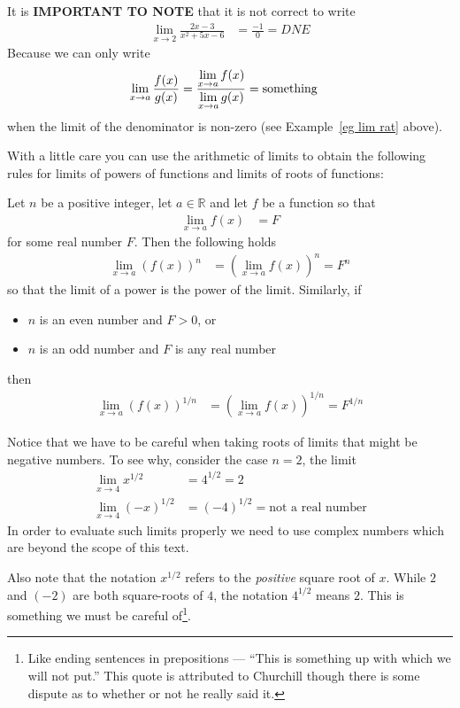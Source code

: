 It is \textbf{IMPORTANT TO NOTE} that it is not correct to write
\begin{align*}
\lim_{x \to 2} \frac{2x-3}{x^2+5x-6}
  &= \frac{-1}{0} = DNE
\end{align*}
Because we can only write
\begin{align*}
  \lim_{x \to a} \frac{f(x)}{g(x)} &= \frac{\displaystyle \lim_{x \to a} f(x)}{\displaystyle
\lim_{x \to a} g(x) } = \text{something}
\end{align*}
when the limit of the denominator is non-zero (see Example~\ref{eg lim rat} above).

With a little care you can use the arithmetic of limits to obtain the
following rules for limits of powers of functions and limits of roots of
functions:
\begin{theorem}
\label{thm lim powers}
  Let $n$ be a positive integer, let $a \in \mathbb{R}$ and let $f$ be a
function so that
\begin{align*}
  \lim_{x \to a} f(x) &= F
\end{align*}
  for some real number $F$. Then the following holds
\begin{align*}
  \lim_{x \to a} \left( f(x) \right)^n
  &= \left(\lim_{x \to a} f(x) \right)^n = F^n
\end{align*}
so that the limit of a power is the power of the limit. Similarly, if
\begin{itemize}
 \item $n$ is an even number and $F>0$, or
 \item $n$ is an odd number and $F$ is any real number
\end{itemize}
then
\begin{align*}
  \lim_{x \to a} \left( f(x) \right)^{1/n}
  &= \left(\lim_{x \to a} f(x) \right)^{1/n} = F^{1/n}
\end{align*}
\end{theorem}
Notice that we have to be careful when taking roots of limits that might be
negative numbers. To see why, consider the case $n=2$, the limit
\begin{align*}
  \lim_{x \to 4} x^{1/2} &= 4^{1/2} = 2 \\
  \lim_{x \to 4} (-x)^{1/2} &= (-4)^{1/2} = \text{not a real number}
\end{align*}
In order to evaluate such limits properly we need to use complex numbers which
are beyond the scope of this text.

Also note that the notation $x^{1/2}$ refers to the \emph{positive} square root
of $x$. While $2$ and $(-2)$ are both square-roots of $4$, the notation
$4^{1/2}$ means $2$. This is something we must be careful of\footnote{Like
ending sentences in prepositions --- ``This is something up with which we will
not put.'' This quote is attributed to Churchill though there is some dispute as to
whether or not he really said it.}.

